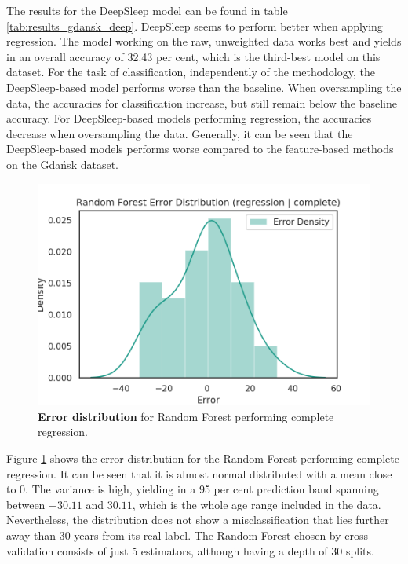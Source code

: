 \documentclass[11pt]{scrartcl}
\begin{document}
The results for the DeepSleep model can be found in table \ref{tab:results_gdansk_deep}. DeepSleep seems to perform better when applying regression. The model working on the raw, unweighted data works best and yields in an overall accuracy of 32.43 per cent, which is the third-best model on this dataset. For the task of classification, independently of the methodology, the DeepSleep-based model performs worse than the baseline. When oversampling the data, the accuracies for classification increase, but still remain below the baseline accuracy. For DeepSleep-based models performing regression, the accuracies decrease when oversampling the data. Generally, it can be seen that the DeepSleep-based models performs worse compared to the feature-based methods on the Gdańsk dataset.

\begin{figure}[hbt]
	\center
	\includegraphics[width=1.0\textwidth]{img/learning/original_gdansk_random_forest_regression_complete_error_distribution.png}
	\caption{\textcolor{viridis5}{\textbf{Error distribution}} for Random Forest performing complete regression.}
	\label{fig:original_gdansk_random_forest_regression_complete_error_distribution_unbiased_inline}
\end{figure}

Figure \ref{fig:original_gdansk_random_forest_regression_complete_error_distribution_unbiased_inline} shows the error distribution for the Random Forest performing complete regression. It can be seen that it is almost normal distributed with a mean close to 0. The variance is high, yielding in a 95 per cent prediction band spanning between $-30.11$ and $30.11$, which is the whole age range included in the data. Nevertheless, the distribution does not show a misclassification that lies further away than 30 years from its real label. The Random Forest chosen by cross-validation consists of just 5 estimators, although having a depth of 30 splits.
\end{document}
